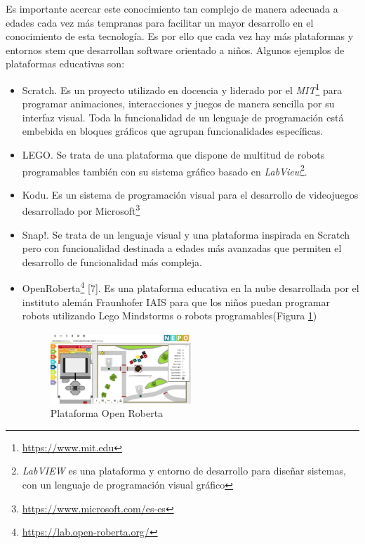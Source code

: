 Es importante acercar este conocimiento tan complejo de manera adecuada a edades cada vez más tempranas para facilitar un mayor desarrollo en el conocimiento de esta tecnología. Es por ello que cada vez hay más plataformas y entornos \acrshort{stem} que desarrollan software orientado a niños. Algunos ejemplos de plataformas educativas son: 
\begin{itemize}
  \item Scratch\cite{Scratch}. Es un proyecto utilizado en docencia y liderado por el \textit{MIT}\footnote{\url{https://www.mit.edu}} para programar animaciones, interacciones y juegos de manera sencilla por su interfaz visual. Toda la funcionalidad de un lenguaje de programación está embebida en bloques gráficos que agrupan funcionalidades específicas.
  \item LEGO\cite{Lego}. Se trata de una plataforma que dispone de multitud de robots programables también con su sistema gráfico basado en \textit{LabView}\footnote{\textit{LabVIEW} es una plataforma y entorno de desarrollo para diseñar sistemas, con un lenguaje de programación visual gráfico}.
  \item Kodu\cite{Kodu}. Es un sistema de programación visual para el desarrollo de videojuegos desarrollado por Microsoft\footnote{\url{https://www.microsoft.com/es-es}}
  \item Snap!\cite{Snap}. Se trata de un lenguaje visual y una plataforma inspirada en Scratch pero con funcionalidad destinada a edades más avanzadas que permiten el desarrollo de funcionalidad más compleja.
  \item OpenRoberta\footnote{\url{https://lab.open-roberta.org/}} [7]. Es una plataforma educativa en la nube desarrollada por el instituto alemán Fraunhofer IAIS para que los niños puedan programar robots utilizando Lego Mindstorms o robots programables(Figura \ref{fig.roberta})
  \begin{figure}[H]
  \begin{center}
    \includegraphics[width=0.5\textwidth]{figures/introduccion/openRoberta.png}
		\caption{Plataforma Open Roberta}
		\label{fig.roberta}
		\end{center}
\end{figure}

\end{itemize}

